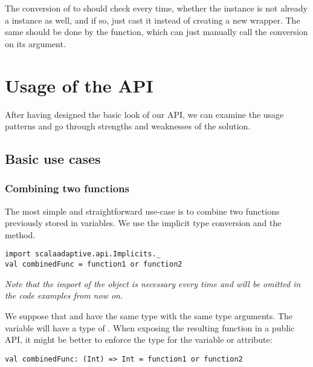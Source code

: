 The conversion of  to  should check every time, whether the  instance is not already a  instance as well, and if so, just cast it instead of creating a new wrapper. The same should be done by the  function, which can just manually call the conversion on its argument.

\section{Usage of the API}
\label{sec:api_usage}

After having designed the basic look of our API, we can examine the usage patterns and go through strengths and weaknesses of the solution.

\subsection{Basic use cases}

\subsubsection{Combining two functions}

The most simple and straightforward use-case is to combine two functions previously stored in variables. We use the implicit type conversion and the  method.

\lstset{style=Scala}
\begin{lstlisting}
import scalaadaptive.api.Implicits._
val combinedFunc = function1 or function2
\end{lstlisting}

\textit{Note that the import of the  object is necessary every time and will be omitted in the code examples from now on.}

We suppose that  and  have the same type  with the same type arguments. The  variable will have a type of . When exposing the resulting function in a public API, it might be better to enforce the  type for the variable or attribute:

\lstset{style=Scala}
\begin{lstlisting}
val combinedFunc: (Int) => Int = function1 or function2
\end{lstlisting}

